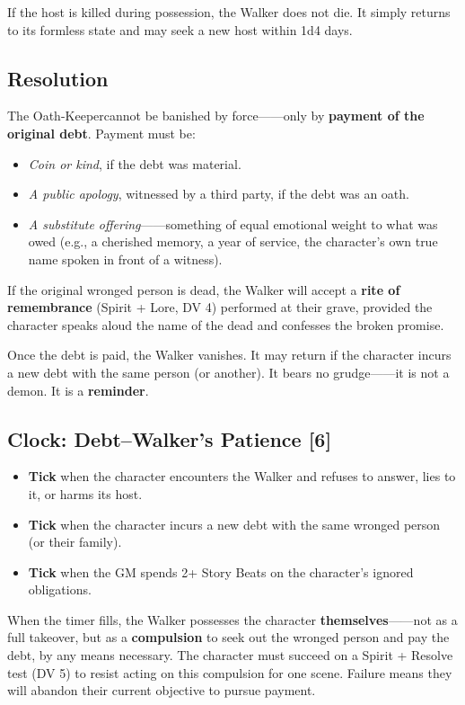 If the host is killed during possession, the Walker does not die. It simply returns to its formless state and may seek a new host within 1d4 days.

\subsection{Resolution}

The Oath-Keepercannot be banished by force------only by \textbf{payment of the original debt}. Payment must be:

\begin{itemize}
    \item \textit{Coin or kind}, if the debt was material.
    \item \textit{A public apology}, witnessed by a third party, if the debt was an oath.
    \item \textit{A substitute offering}------something of equal emotional weight to what was owed (e.g., a cherished memory, a year of service, the character's own true name spoken in front of a witness).
\end{itemize}

If the original wronged person is dead, the Walker will accept a \textbf{rite of remembrance} (Spirit + Lore, DV 4) performed at their grave, provided the character speaks aloud the name of the dead and confesses the broken promise.

Once the debt is paid, the Walker vanishes. It may return if the character incurs a new debt with the same person (or another). It bears no grudge------it is not a demon. It is a \textbf{reminder}.

\subsection{Clock: Debt--Walker's Patience [6]}

\begin{itemize}
    \item \textbf{Tick} when the character encounters the Walker and refuses to answer, lies to it, or harms its host.
    \item \textbf{Tick} when the character incurs a new debt with the same wronged person (or their family).
    \item \textbf{Tick} when the GM spends 2+ Story Beats on the character's ignored obligations.
\end{itemize}

When the timer fills, the Walker possesses the character \textbf{themselves}------not as a full takeover, but as a \textbf{compulsion} to seek out the wronged person and pay the debt, by any means necessary. The character must succeed on a Spirit + Resolve test (DV 5) to resist acting on this compulsion for one scene. Failure means they will abandon their current objective to pursue payment.

